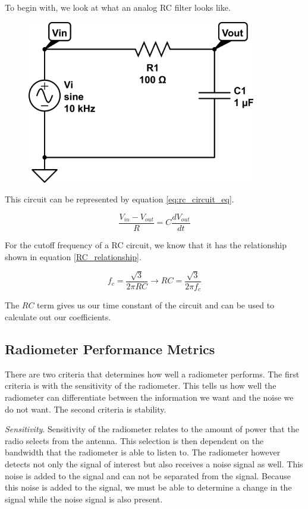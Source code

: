 To begin with, we look at what an analog RC filter looks like. 

{\begin{figure}[h!tb] 
\centering
\includegraphics[width=10cm]{Images/rc-circuit.png}
\label{rc_circuit}
\end{figure}
}

This circuit can be represented by equation \ref{eq:rc_circuit_eq}.

\begin{equation}\label{eq:rc_circuit_eq}
\frac{V_{in}-V_{out}}{R}=C\frac{dV_{out}}{dt}
\end{equation}

For the cutoff frequency of a RC circuit, we know that it has the relationship shown in equation \ref{RC_relationship}.

\begin{equation}\label{RC_relationship}
f_c=\frac{\sqrt{3}}{2\pi RC}\rightarrow RC=\frac{\sqrt{3}}{2\pi f_c}
\end{equation}

The $RC$ term gives us our time constant of the circuit and can be used to calculate out our coefficients. 

\subsection{Radiometer Performance Metrics}
There are two criteria that determines how well a radiometer performs.  The first criteria is with the sensitivity of the radiometer.  This tells us how well the radiometer can differentiate between the information we want and the noise we do not want.  The second criteria is stability.

\emph{Sensitivity}.  Sensitivity of the radiometer relates to the amount of power that the radio selects from the antenna.  This selection is then dependent on the bandwidth that the radiometer is able to listen to.  The radiometer however detects not only the signal of interest but also receives a noise signal as well.  This noise is added to the signal and can not be separated from the signal.  Because this noise is added to the signal, we must be able to determine a change in the signal while the noise signal is also present.  


